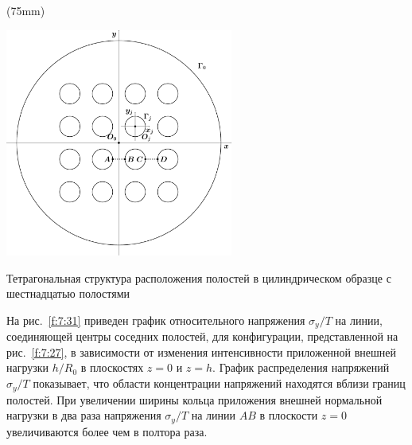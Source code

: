 \sidefig(75mm){
\includegraphics[width=7.5cm]{tetragonal-16.pdf}
\caption{Тетрагональная структура расположения полостей в цилиндрическом образце с шестнадцатью полостями}
\label{f:7:27}
}{На рис.~\ref{f:7:31} приведен график относительного напряжения $\sigma_y/T$ на линии, соединяющей центры соседних полостей, для конфигурации, представленной на рис.~\ref{f:7:27}, в зависимости от изменения интенсивности приложенной внешней нагрузки $h/R_0$ в плоскостях $z=0$ и $z=h$. График распределения напряжений $\sigma_y/T$ показывает, что области концентрации напряжений находятся вблизи границ полостей. При увеличении ширины кольца приложения внешней нормальной нагрузки в два раза напряжения $\sigma_y/T$ на линии $AB$ в плоскости $z=0$ увеличиваются более чем в полтора раза.\par\sloppy
}

